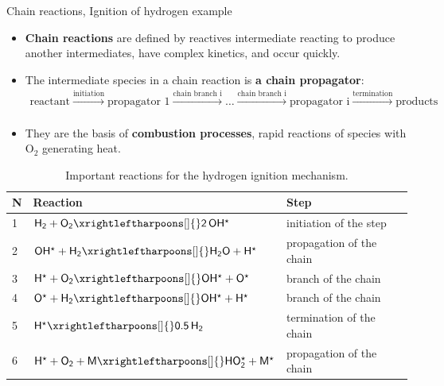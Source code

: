 %
%
\begin{frame}[<+->]{Chain reactions, Ignition of hydrogen example}
	\small
	\begin{itemize}
		\item \alert{\bf Chain reactions} are defined by reactives intermediate reacting to produce another intermediates, 
		have complex kinetics, and occur quickly.
		\item The intermediate species in a chain reaction is \alert{\bf a chain propagator}:
		\begin{multline*}
			\mbox{reactant} \xrightarrow[]{\text{initiation}} \mbox{propagator 1} \xrightarrow[]{\text{chain branch i}} \ldots
			\xrightarrow[]{\text{chain branch i}} \mbox{propagator i} \xrightarrow[]{\text{termination}} \mbox{products} 
		\end{multline*}
		\item They are the basis of \alert{\bf combustion processes}, rapid reactions of species with O$_2$ generating heat. 
	\end{itemize}
	\begin{table}
		\begin{tabular*}{1\textwidth}{@{\extracolsep{\fill}}lll}
			\toprule 
			N & Reaction & Step \\[-5pt]
			\midrule 
			1 & $\mathsf{H_2 + O_2 \xrightleftharpoons[]{} 2\, OH^\star}$ &	initiation of the step \\[-3pt]
			2 & $\mathsf{OH^\star + H_2 \xrightleftharpoons[]{} H_2O + H^\star}$ &	propagation of the chain \\[-3pt]
			3 & $\mathsf{H^\star + O_2 \xrightleftharpoons[]{} OH^\star + O^\star}$ & branch of the chain \\[-3pt]
			4 & $\mathsf{O^\star + H_2 \xrightleftharpoons[]{} OH^\star + H^\star}$ & branch of the chain  \\[-3pt]
			5 & $\mathsf{H^\star \xrightleftharpoons[]{} 0.5 \, H_2}$ &	termination of the chain \\[-3pt]
			6 & $\mathsf{H^\star + O_2 + M \xrightleftharpoons[]{} HO_2^\star +M^\star }$ & propagation of the chain \\[-3pt]
			\bottomrule
		\end{tabular*}
		\caption{Important reactions for the hydrogen ignition mechanism.}
	\end{table}
\end{frame}
%
